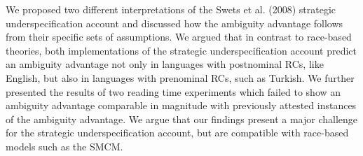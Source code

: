 \documentclass[english, doc]{apa7}\usepackage[]{graphicx}\usepackage[]{color}
\begin{document}
We proposed two different interpretations of the Swets et al. (2008) strategic underspecification account and discussed how the ambiguity advantage follows from their specific sets of assumptions.  
We argued that in contrast to race-based theories, both implementations of the strategic underspecification account predict an ambiguity advantage not only in languages with postnominal RCs, like English, but also in languages with prenominal RCs, such as Turkish.
We further presented the results of two reading time experiments which failed to show an ambiguity advantage comparable in magnitude with previously attested instances of the ambiguity advantage. 
We argue that our findings present a major challenge for the strategic underspecification account, but are compatible with race-based models such as the SMCM.



 

\end{document}
